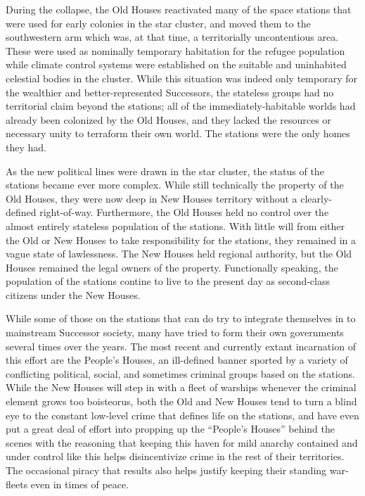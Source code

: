 \documentclass[11pt]{report}
\begin{document}
    During the collapse, the Old Houses reactivated many of the space stations that were used for early colonies in the star cluster, and moved them to the southwestern arm which was, at that time, a territorially uncontentious area. These were used as nominally temporary habitation for the refugee population while climate control systems were established on the suitable and uninhabited celestial bodies in the cluster. While this situation was indeed only temporary for the wealthier and better-represented Successors, the stateless groups had no territorial claim beyond the stations; all of the immediately-habitable worlds had already been colonized by the Old Houses, and they lacked the resources or necessary unity to terraform their own world. The stations were the only homes they had.

    As the new political lines were drawn in the star cluster, the status of the stations became ever more complex. While still technically the property of the Old Houses, they were now deep in New Houses territory without a clearly-defined right-of-way. Furthermore, the Old Houses held no control over the almost entirely stateless population of the stations. With little will from either the Old or New Houses to take responsibility for the stations, they remained in a vague state of lawlessness. The New Houses held regional authority, but the Old Houses remained the legal owners of the property. Functionally speaking, the population of the stations contine to live to the present day as second-class citizens under the New Houses.

    While some of those on the stations that can do try to integrate themselves in to mainstream Successor society, many have tried to form their own governments several times over the years. The most recent and currently extant incarnation of this effort are the People's Houses, an ill-defined banner sported by a variety of conflicting political, social, and sometimes criminal groups based on the stations. While the New Houses will step in with a fleet of warships whenever the criminal element grows too boisteorus, both the Old and New Houses tend to turn a blind eye to the constant low-level crime that defines life on the stations, and have even put a great deal of effort into propping up the ``People's Houses'' behind the scenes with the reasoning that keeping this haven for mild anarchy contained and under control like this helps disincentivize crime in the rest of their territories. The occasional piracy that results also helps justify keeping their standing war-fleets even in times of peace.
\end{document}
